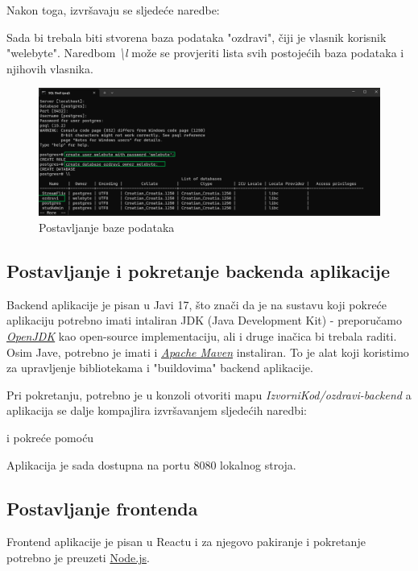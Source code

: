 			Nakon toga, izvršavaju se sljedeće naredbe:
			

			Sada bi trebala biti stvorena baza podataka "ozdravi", čiji je vlasnik korisnik "welebyte". Naredbom \textit{\textbackslash l} može se provjeriti lista svih postojećih 
			baza podataka i njihovih vlasnika.
			\begin{figure}[H]
				\includegraphics[width=\textwidth]{slike/sqlshell2.png} 
				\caption{Postavljanje baze podataka} 
			\end{figure}
	
			\subsection*{Postavljanje i pokretanje backenda aplikacije}
			Backend aplikacije je pisan u Javi 17, što znači da je na sustavu koji pokreće aplikaciju potrebno imati intaliran JDK (Java Development Kit) - preporučamo \href{https://www.openjdk.org}{\textit{OpenJDK}} kao open-source implementaciju, ali i druge inačica bi trebala raditi.
			Osim Jave, potrebno je imati i \href{https://maven.apache.org/download.cgi}{\textit{Apache Maven}} instaliran. To je alat koji koristimo za upravljenje bibliotekama i "buildovima" backend aplikacije.
			
			Pri pokretanju, potrebno je u konzoli otvoriti mapu \textit{IzvorniKod/ozdravi-backend} a aplikacija se dalje kompajlira izvršavanjem sljedećih naredbi:
			

			i pokreće pomoću 
			
			
			Aplikacija je sada dostupna na portu 8080 lokalnog stroja.

			\subsection*{Postavljanje frontenda}
			Frontend aplikacije je pisan u Reactu i za njegovo pakiranje i pokretanje potrebno je preuzeti \href{https://nodejs.org/en/download/}{Node.js}.

